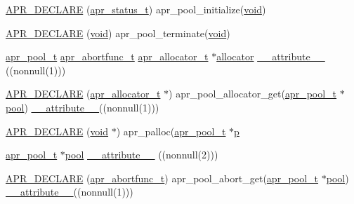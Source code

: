 \begin{DoxyCompactItemize}
\item 
\hyperlink{group__apr__pools_ga95a4b4050d59535eea61951c649d49e6}{A\+P\+R\+\_\+\+D\+E\+C\+L\+A\+RE} (\hyperlink{group__apr__errno_gaa5105fa83cc322f09382292db8b47593}{apr\+\_\+status\+\_\+t}) apr\+\_\+pool\+\_\+initialize(\hyperlink{group__MOD__ISAPI_gacd6cdbf73df3d9eed42fa493d9b621a6}{void})
\item 
\hyperlink{group__apr__pools_gac01d61b42e8b6e65b0da64d18ce146ac}{A\+P\+R\+\_\+\+D\+E\+C\+L\+A\+RE} (\hyperlink{group__MOD__ISAPI_gacd6cdbf73df3d9eed42fa493d9b621a6}{void}) apr\+\_\+pool\+\_\+terminate(\hyperlink{group__MOD__ISAPI_gacd6cdbf73df3d9eed42fa493d9b621a6}{void})
\item 
\hyperlink{structapr__pool__t}{apr\+\_\+pool\+\_\+t} \hyperlink{group__apr__pools_ga370a939349adf6d1438068e2fc69a0dd}{apr\+\_\+abortfunc\+\_\+t} \hyperlink{structapr__allocator__t}{apr\+\_\+allocator\+\_\+t} $\ast$\hyperlink{group__apr__pools_ga3d4c7b6ba19a3b46b6fecdee3d867787}{allocator} \hyperlink{group__apr__pools_gae343a929da26c12e60a11b0ea647ea90}{\+\_\+\+\_\+attribute\+\_\+\+\_\+} ((nonnull(1)))
\item 
\hyperlink{group__apr__pools_ga4f2ec0d4771217976fecfeef29780ab0}{A\+P\+R\+\_\+\+D\+E\+C\+L\+A\+RE} (\hyperlink{structapr__allocator__t}{apr\+\_\+allocator\+\_\+t} $\ast$) apr\+\_\+pool\+\_\+allocator\+\_\+get(\hyperlink{structapr__pool__t}{apr\+\_\+pool\+\_\+t} $\ast$\hyperlink{group__APR__XLATE_gabb3cd978f04c73d0b763c391e9bfde73}{pool}) \hyperlink{group__APR__Util__Bucket__Brigades_gae0af316ed59541b70389da41aaeef4b6}{\+\_\+\+\_\+attribute\+\_\+\+\_\+}((nonnull(1)))
\item 
\hyperlink{group__apr__pools_ga7cb63e2c63fd7769ce05b8bd5d82b833}{A\+P\+R\+\_\+\+D\+E\+C\+L\+A\+RE} (\hyperlink{group__MOD__ISAPI_gacd6cdbf73df3d9eed42fa493d9b621a6}{void} $\ast$) apr\+\_\+palloc(\hyperlink{structapr__pool__t}{apr\+\_\+pool\+\_\+t} $\ast$\hyperlink{group__APACHE__CORE__MPM_ga5cd91701e5c167f2b1a38e70ab57817e}{p}
\item 
\hyperlink{structapr__pool__t}{apr\+\_\+pool\+\_\+t} $\ast$\hyperlink{group__APR__XLATE_gabb3cd978f04c73d0b763c391e9bfde73}{pool} \hyperlink{group__apr__pools_gab07c79075d4123104a7c152ad13cd63f}{\+\_\+\+\_\+attribute\+\_\+\+\_\+} ((nonnull(2)))
\item 
\hyperlink{group__apr__pools_gaba3977fd7aba8ec156375bf8e6bcf061}{A\+P\+R\+\_\+\+D\+E\+C\+L\+A\+RE} (\hyperlink{group__apr__pools_ga370a939349adf6d1438068e2fc69a0dd}{apr\+\_\+abortfunc\+\_\+t}) apr\+\_\+pool\+\_\+abort\+\_\+get(\hyperlink{structapr__pool__t}{apr\+\_\+pool\+\_\+t} $\ast$\hyperlink{group__APR__XLATE_gabb3cd978f04c73d0b763c391e9bfde73}{pool}) \hyperlink{group__APR__Util__Bucket__Brigades_gae0af316ed59541b70389da41aaeef4b6}{\+\_\+\+\_\+attribute\+\_\+\+\_\+}((nonnull(1)))

\end{DoxyCompactItemize}
